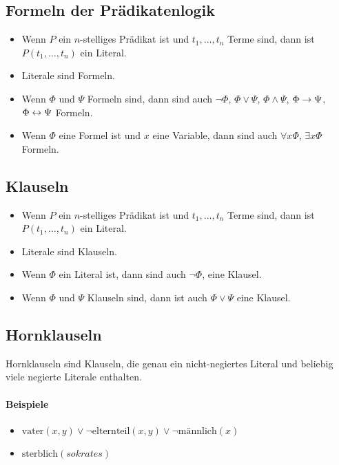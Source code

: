 \documentclass[a4paper]{scrartcl}
\begin{document}
\subsection{Formeln der Prädikatenlogik}
\begin{itemize}
\item Wenn $P$ ein $n$-stelliges Prädikat ist und $t_1, \ldots, t_n$ Terme sind, dann ist $P(t_1, \ldots, t_n)$ ein Literal.
\item Literale sind Formeln.
\item Wenn $\Phi$ und $\Psi$ Formeln sind, dann sind auch $\neg\Phi$, $\Phi\vee\Psi$, $\Phi\wedge\Psi$, $\Phi\rightarrow\Psi$, $\Phi\leftrightarrow\Psi$ Formeln.
\item Wenn $\Phi$ eine Formel ist und $x$ eine Variable, dann sind auch $\forall x\Phi$, $\exists x\Phi$ Formeln.
\end{itemize}

\subsection{Klauseln}
\begin{itemize}
\item Wenn $P$ ein $n$-stelliges Prädikat ist und $t_1, \ldots, t_n$ Terme sind, dann ist $P(t_1, \ldots, t_n)$ ein Literal.
\item Literale sind Klauseln.
\item Wenn $\Phi$ ein Literal ist, dann sind auch $\neg\Phi$, eine Klausel.
\item Wenn $\Phi$ und $\Psi$ Klauseln sind, dann ist auch $\Phi \vee \Psi$ eine Klausel.
\end{itemize}

\subsection{Hornklauseln}

Hornklauseln sind Klauseln, die genau ein nicht-negiertes Literal und beliebig viele negierte Literale enthalten.

\paragraph{Beispiele}
\begin{itemize}
\item $\text{vater}(x,y) \vee \neg\text{elternteil}(x,y) \vee \neg\text{männlich}(x)$ 
\item $\text{sterblich}(sokrates)$
\end{itemize}
\end{document}
